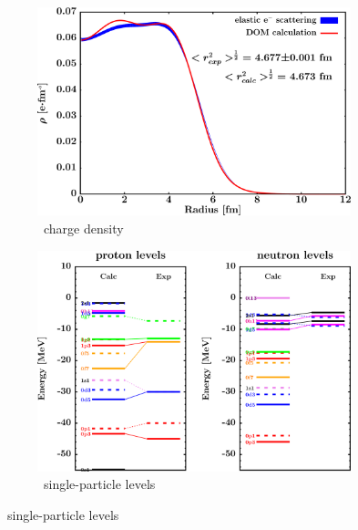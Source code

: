 \afterpage{\clearpage}
\begin{figure}[hbtp]
    \captionsetup[subfigure]{labelformat=empty}
    \centering
    \begin{subfigure}[b]{0.45\textwidth}
        \centering
        \includegraphics[width=\linewidth]{figures/sn124_chargeDensity.png}
        \caption{\snFour\ charge density}
        \label{DOMFitData_sn124_chargeDensity}
    \end{subfigure}\hspace{6pt}
    \begin{subfigure}[b]{0.45\textwidth}
        \centering
        \includegraphics[width=\linewidth]{figures/sn124_SPLevels.png}
        \caption{\snFour\ single-particle levels}
        \label{DOMFitData_sn124_SPLevels}
    \end{subfigure}\vspace{0.3in}

\end{figure}
